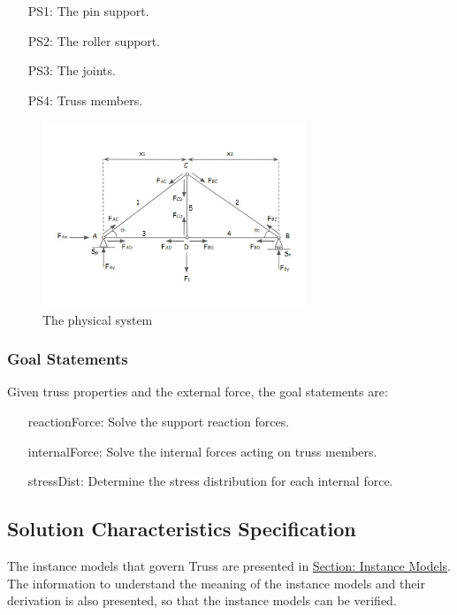 \documentclass[12pt]{article}
\begin{document}
\begin{itemize}
\item[PS1:]{The pin support.}
\item[PS2:]{The roller support.}
\item[PS3:]{The joints.}
\item[PS4:]{Truss members.}
\end{itemize}
\begin{figure}
\begin{center}
\includegraphics[width=0.7\textwidth]{../../../datafiles/Truss/PhysicalSystem.png}
\caption{The physical system}
\label{Figure:physSysImage}
\end{center}
\end{figure}
\subsubsection{Goal Statements}
\label{Sec:GoalStmt}
Given truss properties and the external force, the goal statements are:

\begin{itemize}
\item[reactionForce:\phantomsection\label{reactionForce}]{Solve the support reaction forces.}
\item[internalForce:\phantomsection\label{internalForce}]{Solve the internal forces acting on truss members.}
\item[stressDist:\phantomsection\label{stressDist}]{Determine the stress distribution for each internal force.}
\end{itemize}
\subsection{Solution Characteristics Specification}
\label{Sec:SolCharSpec}
The instance models that govern Truss are presented in \hyperref[Sec:IMs]{Section: Instance Models}. The information to understand the meaning of the instance models and their derivation is also presented, so that the instance models can be verified.
\end{document}
